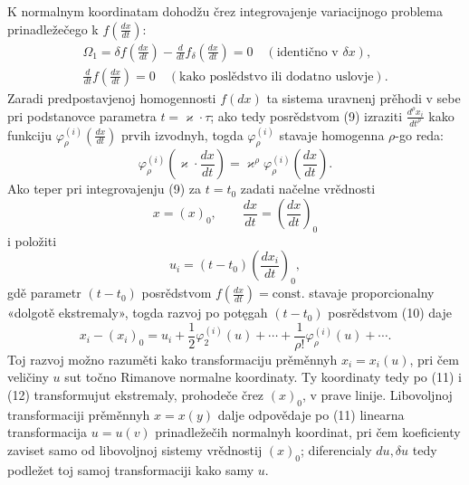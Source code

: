 \documentclass[11pt]{article}
\begin{document}
K normalnym koordinatam dohodžu črez integrovajenje variacijnogo problema prinadležečego k \(f\!\left(\frac{dx}{dt}\right)\):
\begin{equation}
\begin{gathered}
\Omega_1=\delta f\!\left(\frac{dx}{dt}\right)
-\frac{d}{dt}f_\delta\!\left(\frac{dx}{dt}\right)=0
\quad(\text{identično v }\delta x),\\
\frac{d}{dt}f\!\left(\frac{dx}{dt}\right)=0
\quad(\text{kako poslědstvo ili dodatno uslovje}).
\end{gathered}
\tag{9}
\end{equation}
Zaradi predpostavjenoj homogennosti \(f(dx)\) ta sistema uravnenj prěhodi v sebe pri podstanovce parametra \(t=\varkappa\cdot\tau\); ako tedy posrědstvom (9) izraziti \(\frac{d^\rho x_i}{dt^\rho}\) kako funkciju \(\varphi_\rho^{(i)}\!\left(\frac{dx}{dt}\right)\) prvih izvodnyh, togda \(\varphi_\rho^{(i)}\) stavaje homogenna \(\rho\)-go reda:
\begin{equation}
\varphi_\rho^{(i)}\!\left(\varkappa\cdot\frac{dx}{dt}\right)
=\varkappa^\rho\varphi_\rho^{(i)}\!\left(\frac{dx}{dt}\right).
\tag{10}
\end{equation}
Ako teper pri integrovajenju (9) za \(t=t_0\) zadati načelne vrědnosti
\[
x=(x)_0,\qquad \frac{dx}{dt}=\left(\frac{dx}{dt}\right)_0
\]
i položiti
\begin{equation}
u_i=(t-t_0)\left(\frac{dx_i}{dt}\right)_0,
\tag{11}
\end{equation}
gdě parametr \((t-t_0)\) posrědstvom \(f\!\left(\frac{dx}{dt}\right)=\mathrm{const.}\) stavaje proporcionalny «dolgotě ekstremaly», togda razvoj po potęgah \((t-t_0)\) posrědstvom (10) daje
\begin{equation}
x_i-(x_i)_0=u_i+\frac12\varphi_2^{(i)}(u)+\cdots+
\frac{1}{\rho!}\varphi_\rho^{(i)}(u)+\cdots .
\tag{12}
\end{equation}
Toj razvoj možno razuměti kako transformaciju prěměnnyh \(x_i=x_i(u)\), pri čem veličiny \(u\) sut točno Rimanove normalne koordinaty. Ty koordinaty tedy po (11) i (12) transformujut ekstremaly, prohodeče črez \((x)_0\), v prave linije. Libovoljnoj transformaciji prěměnnyh \(x=x(y)\) dalje odpovědaje po (11) linearna transformacija \(u=u(v)\) prinadležečih normalnyh koordinat, pri čem koeficienty zaviset samo od libovoljnoj sistemy vrědnostij \((x)_0\); diferencialy \(du,\delta u\) tedy podležet toj samoj transformaciji kako samy \(u\).
\end{document}
